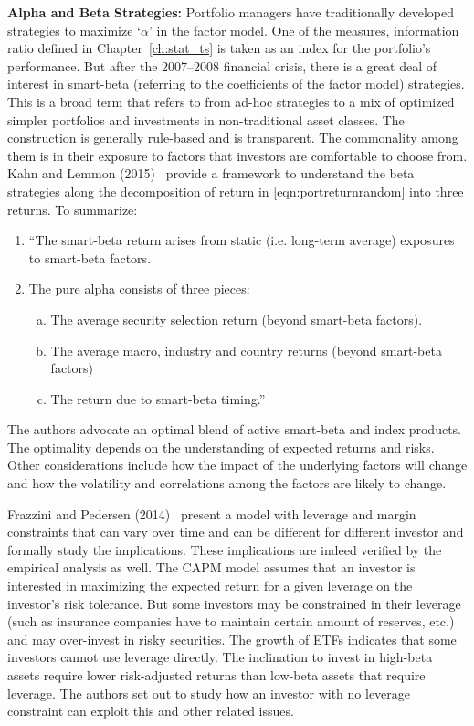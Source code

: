 \noindent\textbf{Alpha and Beta Strategies:} Portfolio managers have traditionally developed strategies to maximize `$\alpha$' in the factor model. One of the measures, information ratio defined in Chapter~\ref{ch:stat_ts} is taken as an index for the portfolio's performance. But after the 2007--2008 financial crisis, there is a great deal of interest in smart-beta (referring to the coefficients of the factor model) strategies. This is a broad term that refers to from ad-hoc strategies to a mix of optimized simpler portfolios and investments in non-traditional asset classes. The construction is generally rule-based and is transparent. The commonality among them is in their exposure to factors that investors are comfortable to choose from. Kahn and Lemmon (2015)~\cite{lemmon} provide a framework to understand the beta strategies along the decomposition of return in \eqref{eqn:portreturnrandom} into three returns. To summarize:
	\begin{enumerate}[--]
	\item ``The smart-beta return arises from static (i.e. long-term average) exposures to smart-beta factors.
	\item The pure alpha consists of three pieces:
		\begin{enumerate}[a.]
		\item The average security selection return (beyond smart-beta factors).
		\item The average macro, industry and country returns (beyond smart-beta factors)
		\item The return due to smart-beta timing.''
		\end{enumerate}
	\end{enumerate}
The authors advocate an optimal blend of active smart-beta and index products. The optimality depends on the understanding of expected returns and risks. Other considerations include how the impact of the underlying factors will change and how the volatility and correlations among the factors are likely to change. 


Frazzini and Pedersen (2014)~\cite{frazped} present a model with leverage and margin constraints that can vary over time and can be different for different investor and formally study the implications. These implications are indeed verified by the empirical analysis as well. The CAPM model assumes that an investor is interested in maximizing the expected return for a given leverage on the investor's risk tolerance. But some investors may be constrained in their leverage (such as insurance companies have to maintain certain amount of reserves, etc.) and may over-invest in risky securities. The growth of ETFs indicates that some investors cannot use leverage directly. The inclination to invest in high-beta assets require lower risk-adjusted returns than low-beta assets that require leverage. The authors set out to study how an investor with no leverage constraint can exploit this and other related issues. 


